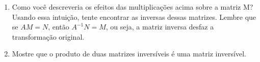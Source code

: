\documentclass{article}
\begin{document}
\begin{enumerate}
	\item Como você descreveria os efeitos das multiplicações acima sobre a matriz M? Usando
		essa intuição, tente encontrar as inversas dessas matrizes. Lembre que se
		$AM=N$, então $A^{-1}N=M$, ou seja, a matriz inversa desfaz a transformação
		original.

	\item Mostre que o produto de duas matrizes inversíveis é uma matriz inversível.
	
			


\end{enumerate}
	
\end{document}
